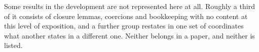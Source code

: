 \documentclass[11pt,a4paper]{article}
\theoremstyle{plain}
\theoremstyle{definition}
\begin{document}
Some results in the development are not represented here at all. Roughly a third of it consists
of closure lemmas, coercions and bookkeeping with no content at this level of exposition, and a
further group restates in one set of coordinates what another states in a different one. Neither
belongs in a paper, and neither is listed.
\end{document}
